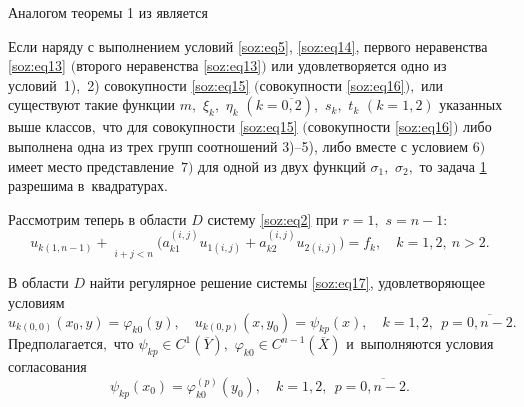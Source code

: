 Аналогом теоремы 1 из \cite{soz:bib:sozontova} является

\hypertarget{soz:th2}{}
\begin{theorem}[2]Если наряду с выполнением  условий {\rm \eqref{soz:eq5}, \eqref{soz:eq14},} первого неравенства  \eqref{soz:eq13} $($второго неравенства \eqref{soz:eq13}$)$ 
или удовлетворяется  одно из условий~\mbox{\rm 1), 2)} совокупности \eqref{soz:eq15} $($совокупности \eqref{soz:eq16}$),$ или существуют такие функции $m,$ $\xi_{k},$ $\eta_{k}$ $(k=\overline{0, 2}),$ $s_{k},$ $t_{k}$  $(k=1, 2)$ указанных выше классов$,$ что для совокупности \eqref{soz:eq15} $($совокупности \eqref{soz:eq16}$)$ либо выполнена одна из трех групп соотношений {\rm 3)--5),} либо вместе с условием $6)$ имеет место представление~$7)$
для одной из двух функций $\sigma_{1},$ $\sigma_{2},$ то задача \hyperlink{soz:task1}{\rm 1}  разрешима в~квадратурах.
\end{theorem}


Рассмотрим теперь в области $D$ систему \eqref{soz:eq2}  при $r=1,$ $s=n-1$:
\begin{equation}
\label{soz:eq17}
u_{k(1,n-1)}+
\mathop{\sum\limits_{i=0}^{1}\sum\limits_{j=0}^{n-1}}\limits_{i + j < n} \bigl(a_{k1}^{(i,j)}u_{1(i,j)}+a_{k2}^{(i,j)}u_{2(i,j)}\bigr)=f_{k}, \quad  k=1, 2,\ n>2.
\end{equation}

\hypertarget{soz:task2}{}

\begin{task}[2]В области $D$ найти регулярное решение системы  {\rm \eqref{soz:eq17},}
удовлетворяющее условиям
\begin{equation*}
u_{k(0,0)}(x_{0},y)=\varphi_{k0}(y),\quad u_{k(0,p)}(x,y_{0})=\psi_{kp}(x),\quad 
 k=1, 2,\ \ p=\overline{0, n-2}.
\end{equation*}
Предполагается$,$ что $\psi_{kp} \in C^{1}(\overline{Y}),$ $ \varphi_{k0} \in C^{n-1}(\overline{X})$ и~выполняются условия согласования
\begin{equation}
\psi_{kp}(x_{0})=\varphi_{k0}^{(p)}(y_{0}),\quad  k=1, 2,\ \ p=\overline{0, n-2}.
\end{equation}
\end{task}


